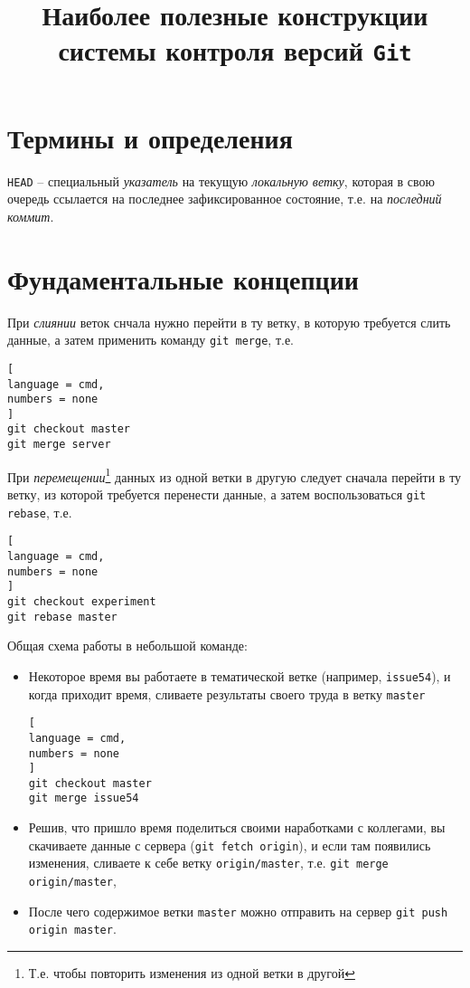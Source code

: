 \documentclass[%
	11pt,
	a4paper,
	utf8,
		]{article}
\begin{document}
\title{Наиболее полезные конструкции\\системы контроля версий  \texttt{Git}}

\author{}

\date{}
\maketitle

\thispagestyle{fancy}

\tableofcontents


\section{Термины и определения}

\noindent\texttt{HEAD} -- специальный \textit{указатель} на текущую \emph{локальную ветку}, которая в свою очередь ссылается на последнее зафиксированное состояние, т.е. на \emph{последний коммит}.


\section{Фундаментальные концепции}

При \emph{слиянии} веток снчала нужно перейти в ту ветку, в которую требуется слить данные, а затем применить команду \texttt{git merge}, т.е.

\begin{lstlisting}[
language = cmd,
numbers = none
]
git checkout master
git merge server
\end{lstlisting}


При \emph{перемещении}\footnote{Т.е. чтобы повторить изменения из одной ветки в другой} данных из одной ветки в другую следует сначала перейти в ту ветку, из которой требуется перенести данные, а затем воспользоваться \texttt{git rebase}, т.е.

\begin{lstlisting}[
language = cmd,
numbers = none
]
git checkout experiment
git rebase master
\end{lstlisting}


Общая схема работы в небольшой команде:
\begin{itemize}
	\item Некоторое время вы работаете в тематической ветке (например, \texttt{issue54}), и когда приходит время, сливаете результаты своего труда в ветку \texttt{master}
	
\begin{lstlisting}[
language = cmd,
numbers = none
]
git checkout master
git merge issue54
\end{lstlisting}
	
	\item Решив, что пришло время поделиться своими наработками с коллегами, вы скачиваете данные с сервера (\texttt{git fetch origin}), и если там появились изменения, сливаете к себе ветку \texttt{origin/master}, т.е. \texttt{git merge origin/master},
	
	\item После чего содержимое ветки \texttt{master} можно отправить на сервер \texttt{git push origin master}.
\end{itemize}
\end{document}
